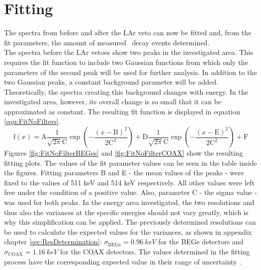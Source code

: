 \documentclass[encoding=utf8,british]{tumphthesis}
\begin{document}
\fi

\section{Fitting}
\label{sec:Fitting}

The spectra from before and after the LAr veto can now be fitted and, from the fit parameters, the amount of measured \Kr\ decay events determined.
\\

The spectra before the LAr vetoes show two peaks in the investigated area.
This requires the fit function to include two Gaussian functions from which only the parameters of the second peak will be used for further analysis.
In addition to the two Gaussian peaks, a constant background parameter will be added.
Theoretically, the  spectra creating this background changes with energy.
In the investigated area, however, its overall change is so small that it can be approximated as constant. 
The resulting fit function is displayed in equation \ref{equ:FitNoFilters}.
\begin{equation}
\mathrm{f}(x) = \mathrm{A}\frac{1}{\sqrt{2\pi}\mathrm{C}}\exp\left(-\frac{(x-\mathrm{B})^2}{2\mathrm{C}^2}\right) + \mathrm{D}\frac{1}{\sqrt{2\pi}\mathrm{C}}\exp\left(-\frac{(x-\mathrm{E})^2}{2\mathrm{C}^2}\right) + \mathrm{F}
\label{equ:FitNoFilters}
\end{equation}
Figures \ref{fig:FitNoFilterBEGes} and \ref{fig:FitNoFilterCOAX} show the resulting fitting plots.
The values of the fit parameter values can be seen in the table inside the figures.
Fitting parameters B and E - the mean values of the peaks - were fixed to the values of 511 keV and 514 keV respectively.
All other values were left free under the condition of a positive value.
Also, parameter C - the sigma value - was used for both peaks.
In the energy area investigated, the two resolutions and thus also the variances at the specific energies should not vary greatly, which is why this simplification can be applied.
The previously determined resolutions can be used to calculate the expected values for the variances, as shown in appendix chapter \ref{sec:ResDetermination}: $\sigma_{\mathrm{BEGe}} = 0.96 \ \unit{keV}$ for the BEGe detectors and $\sigma_{\mathrm{COAX}} = 1.16 \ \unit{keV}$ for the COAX detectors.
The values determined in the fitting process have the corresponding expected value in their range of uncertainty .
\\
\end{document}
